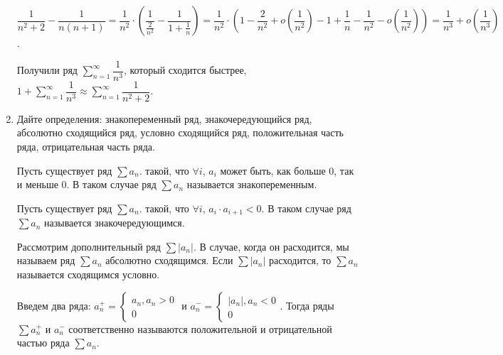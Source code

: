 \documentclass[a4paper]{article}
\begin{document}
\begin{enumerate}
\begin{example}
            $\dfrac{1}{n^2 + 2} - \dfrac{1}{n(n + 1)} = \dfrac{1}{n^2} \cdot \left( \dfrac{1}{\frac{2}{n^2}} - \dfrac{1}{1 + \frac{1}{n}} \right) = \dfrac{1}{n^2} \cdot \left( 1 - \dfrac{2}{n^2} + o \left( \dfrac{1}{n^2} \right) - 1 + \dfrac{1}{n} - \dfrac{1}{n^2} - o \left( \dfrac{1}{n^2} \right) \right) = \dfrac{1}{n^3} + o \left( \dfrac{1}{n^3} \right)$.
         
            Получили ряд $\sum_{n = 1}^{\infty} \dfrac{1}{n^3}$, который сходится быстрее, $1 + \sum_{n = 1}^{\infty} \dfrac{1}{n^3} \approx \sum_{n = 1}^{\infty} \dfrac{1}{n^2 + 2}$.
        \end{example}
    
   		\item Дайте определения: знакопеременный ряд, знакочередующийся ряд, абсолютно сходящийся ряд, условно сходящийся ряд, положительная часть ряда, отрицательная часть ряда.
    
    	\begin{definition}
    		Пусть существует ряд $\sum a_n$. такой, что $\forall i$, $a_i$ может быть, как больше 0, так и меньше 0. В таком случае ряд $\sum a_n$ называется знакопеременным.
    	\end{definition}
    		
    	\begin{definition}
    		Пусть существует ряд $\sum a_n$. такой, что $\forall i$, $a_i \cdot a_{i+1} < 0$. В таком случае ряд $\sum a_n$ называется знакочередующимся.
    	\end{definition}
    
    	\begin{definition}
    		Рассмотрим дополнительный ряд $\sum |a_n|$. В случае, когда он расходится, мы называем ряд $\sum a_n$ абсолютно сходящимся. Если $\sum |a_n|$ расходится, то $\sum a_n$ называется сходящимся условно.
   		\end{definition}
   	
   		\begin{definition}
   			Введем два ряда: $a_n^+ = \begin{cases}
   			a_n, a_n > 0 \\
   			0
   			\end{cases}$ 
   			и $a_n^- = \begin{cases}
   			|a_n|, a_n < 0 \\
   			0
   			\end{cases}$.
   			Тогда ряды $\sum a_n^+$ и $a_n^-$ соответственно называются положительной и отрицательной частью ряда $\sum a_n$.
   		\end{definition}
   	

\end{enumerate}
\end{document}
